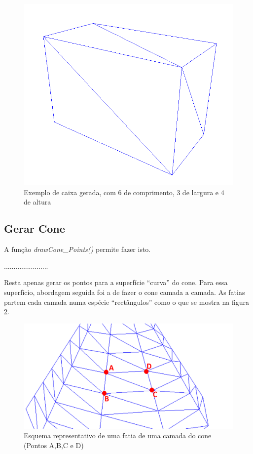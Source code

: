 \begin{figure}[<+htpb+>]
	\centering
	\includegraphics[scale=0.5]{imagens/p3_caixa_6_3_4.png}
	\caption{Exemplo de caixa gerada, com 6 de comprimento, 3 de largura e 4 de altura}
	\label{p1:fig:p3_caixa_6_3_4}
\end{figure}



\subsection{Gerar Cone}


A função \textit{drawCone\_Points()} permite fazer isto.

.......................

 Resta apenas gerar os pontos para a superfície ``curva'' do cone. Para essa superfício, abordagem seguida foi a de fazer o cone camada a camada. As fatias partem cada camada numa espécie ``rectângulos'' como o que se mostra na figura \ref{p1:fig:p3_seccaoCone_edit}.


\begin{figure}[<+htpb+>]
	\centering
	\includegraphics[scale=0.5]{imagens/p3_seccaoCone_edit.png}
	\caption{Esquema representativo de uma fatia de uma camada do cone (Pontos A,B,C e D)}
	\label{p1:fig:p3_seccaoCone_edit}
\end{figure}


